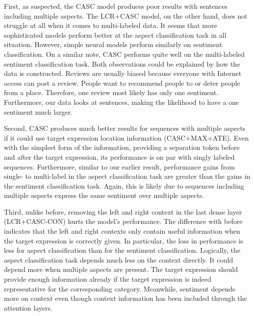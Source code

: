 \documentclass[american, oneside]{ecsgdp}
\begin{document}
First, as suspected, the CASC model produces poor results with sentences including multiple aspects. The LCR+CASC model, on the other hand, does not struggle at all when it comes to multi-labeled data. It seems that more sophisticated models perform better at the aspect classification task in all situation. However, simple neural models perform similarly on sentiment classification. On a similar note, CASC performs quite well on the multi-labeled sentiment classification task. Both observations could be explained by how the data is constructed. Reviews are usually biased because everyone with Internet access can post a review. People want to recommend people to or deter people from a place. Therefore, one review most likely has only one sentiment. Furthermore, our data looks at sentences, making the likelihood to have a one sentiment much larger.

Second, CASC produces much better results for sequences with multiple aspects if it could use target expression location information (CASC+MAX+ATE). Even with the simplest form of the information, providing a separation token before and after the target expression, its performance is on par with singly labeled sequences. Furthermore, similar to our earlier result, performance gains from single- to multi-label in the aspect classification task are greater than the gains in the sentiment classification task. Again, this is likely due to sequences including multiple aspects express the same sentiment over multiple aspects.


Third, unlike before, removing the left and right context in the last dense layer (LCR+CASC-CON) hurts the model's performance. The difference with before indicates that the left and right contexts only contain useful information when the target expression is correctly given. In particular, the loss in performance is less for aspect classification than for the sentiment classification. %
Logically, the aspect classification task depends much less on the context directly. It could depend more when multiple aspects are present. The target expression should provide enough information already if the target expression is indeed representative for the corresponding category. Meanwhile, sentiment depends more on context even though context information has been included through the attention layers. 
\end{document}
